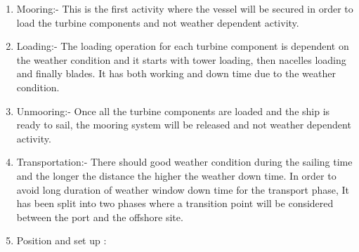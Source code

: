 \begin{enumerate}
\item Mooring:- This is the first activity where the vessel will be secured in order to load the turbine components and not weather dependent activity.
\item Loading:- The loading operation for each turbine component is dependent on the weather condition and it starts with tower loading, then nacelles loading and finally blades. It has both working and down time due to the weather condition.
\item Unmooring:- Once all the turbine components are loaded and the ship is ready to sail, the mooring system will be released and not weather dependent activity.
\item Transportation:- There should good weather condition during the sailing time and the longer the distance the higher the weather down time. In order to avoid long duration of weather window down time  for the transport phase, It has been split into two phases where a transition point will be considered between the port and the offshore site.
\item Position and set up : 
\end{enumerate}